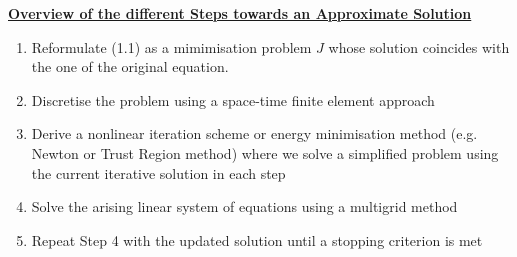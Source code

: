 \documentclass[../draft_1.tex]{subfiles}
\begin{document}
\begin{framed}
	\underline{\textbf{Overview of the different Steps towards an Approximate Solution}} 
	
	\begin{enumerate}
		\item  Reformulate (1.1) as a mimimisation problem $J$ whose solution coincides with the one of the original equation. 
		\item Discretise the problem using a space-time finite element approach
		\item Derive a nonlinear iteration scheme or energy minimisation method (e.g. Newton or Trust Region method) where we solve a simplified problem using the current iterative solution in each step
		\item  Solve the arising linear system of equations using a multigrid method
		\item Repeat Step 4 with the updated solution until a stopping criterion is met 
	\end{enumerate}	
\end{framed}
\end{document}
